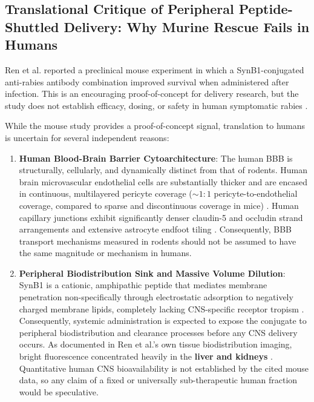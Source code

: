 \documentclass[12pt,a4paper]{article}
\begin{document}
\subsection{Translational Critique of Peripheral Peptide-Shuttled Delivery: Why Murine Rescue Fails in Humans}

Ren et al. reported a preclinical mouse experiment in which a SynB1-conjugated anti-rabies antibody combination improved survival when administered after infection. This is an encouraging proof-of-concept for delivery research, but the study does not establish efficacy, dosing, or safety in human symptomatic rabies \citep{ren2025synb1}.

While the mouse study provides a proof-of-concept signal, translation to humans is uncertain for several independent reasons:

\begin{enumerate}
    \item \textbf{Human Blood-Brain Barrier Cytoarchitecture}:
    The human BBB is structurally, cellularly, and dynamically distinct from that of rodents. Human brain microvascular endothelial cells are substantially thicker and are encased in continuous, multilayered pericyte coverage ($\sim 1:1$ pericyte-to-endothelial coverage, compared to sparse and discontinuous coverage in mice) \citep{uchida2020bbb, hill2025bbb}. Human capillary junctions exhibit significantly denser claudin-5 and occludin strand arrangements and extensive astrocyte endfoot tiling \citep{hill2025bbb}. Consequently, BBB transport mechanisms measured in rodents should not be assumed to have the same magnitude or mechanism in humans.
    
    \item \textbf{Peripheral Biodistribution Sink and Massive Volume Dilution}:
    SynB1 is a cationic, amphipathic peptide that mediates membrane penetration non-specifically through electrostatic adsorption to negatively charged membrane lipids, completely lacking CNS-specific receptor tropism \citep{rousselle2001, ren2025synb1}. Consequently, systemic administration is expected to expose the conjugate to peripheral biodistribution and clearance processes before any CNS delivery occurs. As documented in Ren et al.'s own tissue biodistribution imaging, bright fluorescence concentrated heavily in the \textbf{liver and kidneys} \citep{ren2025synb1}. Quantitative human CNS bioavailability is not established by the cited mouse data, so any claim of a fixed or universally sub-therapeutic human fraction would be speculative.
    

\end{enumerate}
\end{document}

